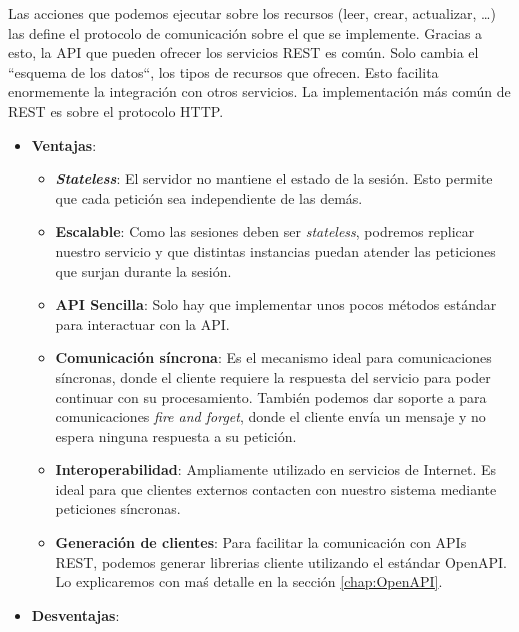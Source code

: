 \begin{itemize}
  Las acciones que podemos ejecutar sobre los recursos (leer, crear, actualizar, \dots) las define el protocolo de comunicación sobre el que se implemente. Gracias a esto, la API que pueden ofrecer los servicios REST es común. Solo cambia el ``esquema de los datos``, los tipos de recursos que ofrecen. Esto facilita enormemente la integración con otros servicios. \cite{nallyRESTVsRPC2018} La implementación más común de REST es sobre el protocolo HTTP.

  \begin{itemize}
    \item \textbf{Ventajas}:

    \begin{itemize}
      \item \textbf{\textit{Stateless}}: El servidor no mantiene el estado de la sesión. Esto permite que cada petición sea independiente de las demás.

      \item \textbf{Escalable}: Como las sesiones deben ser \textit{stateless}, podremos replicar nuestro servicio y que distintas instancias puedan atender las peticiones que surjan durante la sesión.

      \item \textbf{API Sencilla}: Solo hay que implementar unos pocos métodos estándar para interactuar con la API.

      \item \textbf{Comunicación síncrona}: Es el mecanismo ideal para comunicaciones síncronas, donde el cliente requiere la respuesta del servicio para poder continuar con su procesamiento. También podemos dar soporte a para comunicaciones \textit{fire and forget}, donde el cliente envía un mensaje y no espera ninguna respuesta a su petición.

      \item \textbf{Interoperabilidad}: Ampliamente utilizado en servicios de Internet. Es ideal para que clientes externos contacten con nuestro sistema mediante peticiones síncronas. \cite{newmanBuildingMicroservicesDesigning2021}

      \item \textbf{Generación de clientes}: Para facilitar la comunicación con APIs REST, podemos generar librerias cliente utilizando el estándar OpenAPI. Lo explicaremos con maś detalle en la sección \ref{chap:OpenAPI}.
    \end{itemize}

    \item \textbf{Desventajas}:


\end{itemize}
\end{itemize}
